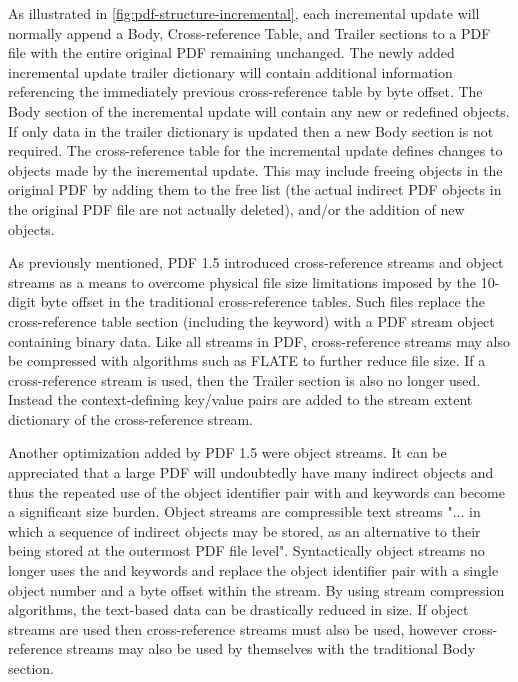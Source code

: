 As illustrated in \cref{fig:pdf-structure-incremental}, each incremental update will 
normally append a Body, Cross-reference Table, and Trailer sections
to a PDF file with the entire original PDF remaining unchanged. The newly added incremental
update trailer dictionary will contain additional information referencing the immediately 
previous cross-reference table by byte offset. The Body section of the incremental update 
will contain any new or redefined objects. If only data in the trailer dictionary is updated then
a new Body section is not required. The cross-reference table for the incremental update
defines changes to objects made by the incremental update. This may include freeing
objects in the original PDF by adding them to the free list (the actual indirect PDF objects in
the original PDF file are not actually deleted), and/or the addition of new objects. 

As previously mentioned, PDF 1.5 introduced cross-reference streams and object streams as a means
to overcome physical file size limitations imposed by the 10-digit byte offset in the traditional
cross-reference tables.
Such files replace the cross-reference table section (including the  keyword) 
with a PDF stream object containing binary data. 
Like all streams in PDF, cross-reference streams may also be compressed with algorithms such as FLATE 
to further reduce file size. If a cross-reference stream is used, then the Trailer section is also no
longer used. Instead the context-defining key/value pairs are added to the stream extent dictionary of the cross-reference stream.

Another optimization added by PDF 1.5 were object streams. It can be appreciated that a large PDF will
undoubtedly have many indirect objects and thus the repeated use of the object identifier pair with   and  keywords can become a significant size burden. Object streams are
compressible text streams "... in which a sequence of indirect objects may be stored, as an 
alternative to their being stored at the outermost PDF file level". 
Syntactically object streams no longer uses the  and  keywords and replace the object identifier pair with a single object number and a byte offset within the stream. 
By using stream compression algorithms, the text-based data can be drastically reduced in size.
If object streams are used then cross-reference streams must also be used, however cross-reference 
streams may also be used by themselves with the traditional Body section.

